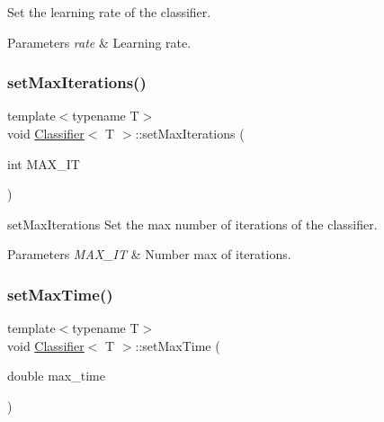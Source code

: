 Set the learning rate of the classifier. 


\begin{DoxyParams}{Parameters}
{\em rate} & Learning rate. \\
\hline
\end{DoxyParams}
\mbox{\label{class_classifier_af3ea28f2e4b7ea19469892ec901b5bb6}} 
\subsubsection{\texorpdfstring{set\+Max\+Iterations()}{setMaxIterations()}}
{\footnotesize\ttfamily template$<$typename T$>$ \\
void \hyperlink{class_classifier}{Classifier}$<$ T $>$\+::set\+Max\+Iterations (\begin{DoxyParamCaption}\item[{int}]{M\+A\+X\+\_\+\+IT }\end{DoxyParamCaption})\hspace{0.3cm}{\ttfamily [inline]}}



set\+Max\+Iterations Set the max number of iterations of the classifier. 


\begin{DoxyParams}{Parameters}
{\em M\+A\+X\+\_\+\+IT} & Number max of iterations. \\
\hline
\end{DoxyParams}
\mbox{\label{class_classifier_a1919729daad9103144bffbd189b9fac9}} 
\subsubsection{\texorpdfstring{set\+Max\+Time()}{setMaxTime()}}
{\footnotesize\ttfamily template$<$typename T$>$ \\
void \hyperlink{class_classifier}{Classifier}$<$ T $>$\+::set\+Max\+Time (\begin{DoxyParamCaption}\item[{double}]{max\+\_\+time }\end{DoxyParamCaption})\hspace{0.3cm}{\ttfamily [inline]}}



